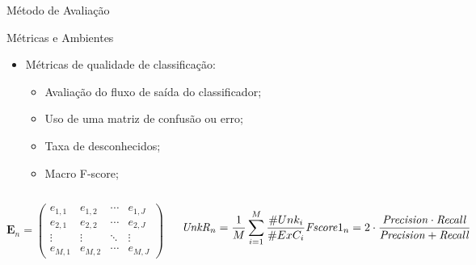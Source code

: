 \documentclass[aspectratio=43,10pt]{beamer}
\begin{document}
\begin{frame}[fragile]{Método de Avaliação}
  \begin{alertblock}{Métricas e Ambientes}
    \begin{itemize}
      \item Métricas de qualidade de classificação:
      \begin{itemize}
        \item Avaliação do fluxo de saída do classificador;
        \item Uso de uma matriz de confusão ou erro;
        \item Taxa de desconhecidos;
        \item Macro F-score;
      \end{itemize}
    \end{itemize}
  \end{alertblock}

  \begin{columns}[T,onlytextwidth]
    \begin{equation*}
      \mathbf{E}_n = \begin{pmatrix}
        e_{1,1} & e_{1,2} & \cdots & e_{1,J} \\
        e_{2,1} & e_{2,2} & \cdots & e_{2,J} \\
        \vdots  & \vdots  & \ddots & \vdots  \\
        e_{M,1} & e_{M,2} & \cdots & e_{M,J} 
      \end{pmatrix}
    \end{equation*}

    
    
    
    \begin{equation*}
        \mathit{UnkR}_n      = \frac{1}{M} \sum_{i=1}^{M} \frac{\#Unk_i}{\#ExC_i} \\
        \mathit{Fscore}1_n   = 2 \cdot \frac{
          \mathit{Precision} \cdot \mathit{Recall}
          }{
            \mathit{Precision} +\mathit{Recall}
          }
    \end{equation*}
  \end{columns}
\end{frame}

\end{document}

